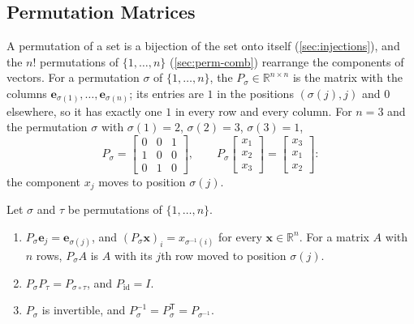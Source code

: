 \subsection{Permutation Matrices}

A permutation of a set is a bijection of the set onto itself (\cref{sec:injections}), and the $n!$ permutations of $\{1,\ldots,n\}$ (\cref{sec:perm-comb}) rearrange the components of vectors. For a permutation $\sigma$ of $\{1,\ldots,n\}$, the  $P_\sigma\in\mathbb R^{n\times n}$ is the matrix with the columns $\mathbf e_{\sigma(1)},\ldots,\mathbf e_{\sigma(n)}$; its entries are $1$ in the positions $(\sigma(j),j)$ and $0$ elsewhere, so it has exactly one $1$ in every row and every column. For $n=3$ and the permutation $\sigma$ with $\sigma(1)=2$, $\sigma(2)=3$, $\sigma(3)=1$,
\[
P_\sigma=\begin{bmatrix}0&0&1\\1&0&0\\0&1&0\end{bmatrix},\qquad P_\sigma\begin{bmatrix}x_1\\x_2\\x_3\end{bmatrix}=\begin{bmatrix}x_3\\x_1\\x_2\end{bmatrix}:
\]
the component $x_j$ moves to position $\sigma(j)$.

\begin{proposition}
\label{prop:permutation-matrices}
Let $\sigma$ and $\tau$ be permutations of $\{1,\ldots,n\}$.
\begin{enumerate}
\item $P_\sigma\mathbf e_j=\mathbf e_{\sigma(j)}$, and $(P_\sigma\mathbf x)_i=x_{\sigma^{-1}(i)}$ for every $\mathbf x\in\mathbb R^n$. For a matrix $A$ with $n$ rows, $P_\sigma A$ is $A$ with its $j$th row moved to position $\sigma(j)$.
\item $P_\sigma P_\tau=P_{\sigma\circ\tau}$, and $P_{\operatorname{id}}=I$.
\item $P_\sigma$ is invertible, and $P_\sigma^{-1}=P_\sigma^{\mathsf T}=P_{\sigma^{-1}}$.
\end{enumerate}
\end{proposition}

